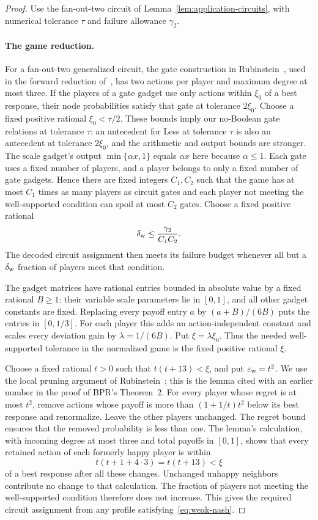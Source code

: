 \begin{proof}
Use the fan-out-two circuit of Lemma~\ref{lem:application-circuits},
with numerical tolerance $\tau$ and failure allowance $\gamma_2$.

\paragraph{The game reduction.}
For a fan-out-two generalized circuit, the gate construction in
Rubinstein~\cite[Section~7]{Rubinstein2018}, used in
the forward reduction of~\cite[Theorem~2]{BPR2016}, has two actions per
player and maximum degree at most three. If the players of a gate
gadget use only actions within $\xi_0$ of a best response, their node
probabilities satisfy that gate at tolerance $2\xi_0$. Choose a fixed
positive rational $\xi_0<\tau/2$. These bounds imply our no-Boolean
gate relations at tolerance $\tau$: an antecedent for Less at
tolerance $\tau$ is also an antecedent at tolerance $2\xi_0$, and
the arithmetic and output bounds are stronger. The scale gadget's
output $\min\{\alpha x,1\}$ equals $\alpha x$ here because $\alpha\leq1$.
Each gate uses a fixed number of players, and a player belongs to only
a fixed number of gate gadgets.
Hence there are fixed integers $C_1,C_2$ such that the game has at most
$C_1$ times as many players as circuit gates and each player not
meeting the well-supported condition can spoil at most $C_2$ gates.
Choose a fixed positive rational
\[
 \delta_{\rm w}\leq\frac{\gamma_2}{C_1C_2}.
\]
The decoded circuit assignment then meets its failure budget whenever
all but a $\delta_{\rm w}$ fraction of players meet that condition.

The gadget matrices have rational entries bounded in absolute value
by a fixed rational $B\geq1$: their variable scale parameters lie in
$[0,1]$, and all other gadget constants are fixed. Replacing every
payoff entry $a$ by $(a+B)/(6B)$ puts the entries in $[0,1/3]$.
For each player this adds an action-independent constant and scales
every deviation gain by $\lambda=1/(6B)$. Put $\xi=\lambda\xi_0$.
Thus the needed well-supported tolerance in the normalized game is
the fixed positive rational $\xi$.

Choose a fixed rational $t>0$ such that
$t(t+13)<\xi$, and put $\varepsilon_{\rm w}=t^2$. We use the local pruning
argument of Rubinstein~\cite[Lemma~5]{Rubinstein2018}; this is the lemma
cited with an earlier number in the proof of BPR's Theorem~2. For every
player whose regret is at most $t^2$, remove actions whose payoff is
more than $(1+1/t)t^2$ below its best response and renormalize.
Leave the other players unchanged. The regret bound ensures that the
removed probability is less than one. The lemma's calculation, with
incoming degree at most three and total payoffs in $[0,1]$, shows that
every retained action of each formerly happy player is within
\[
 t(t+1+4\cdot3)=t(t+13)<\xi
\]
of a best response after all these changes. Unchanged unhappy
neighbors contribute no change to that calculation. The fraction of
players not meeting the well-supported condition therefore does not
increase. This gives the required circuit assignment from any profile
satisfying~\eqref{eq:weak-nash}.


\end{proof}
